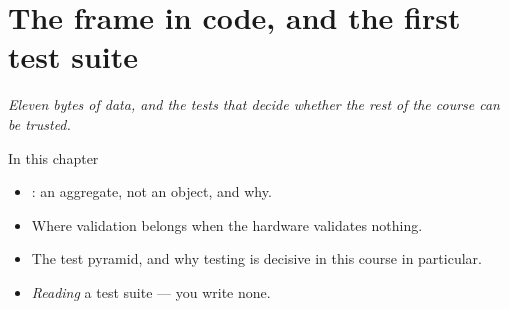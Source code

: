 \chapter{The frame in code, and the first test suite}
\label{ch:frameklassen}


{\large\itshape Eleven bytes of data, and the tests that decide whether the rest of the course can
be trusted.\par}

\begin{chapterbox}{In this chapter}
\begin{itemize}
  \item {}: an aggregate, not an object, and why.
  \item Where validation belongs when the hardware validates nothing.
  \item The test pyramid, and why testing is decisive in this course in particular.
  \item \emph{Reading} a test suite --- you write none.
\end{itemize}
\end{chapterbox}





